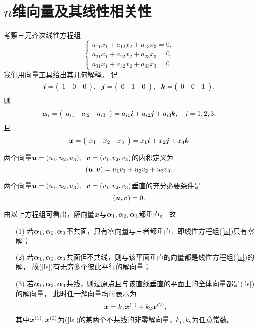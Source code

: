 \section{$n$维向量及其线性相关性}

考察三元齐次线性方程组
\begin{equation}\label{ls}
  \left\{
  \begin{array}{l}
    a_{11}x_1+a_{12}x_2+a_{13}x_3=0,\\[0.1in]
    a_{21}x_1+a_{22}x_2+a_{23}x_3=0,\\[0.1in]
    a_{31}x_1+a_{32}x_2+a_{33}x_3=0
  \end{array}
  \right.
\end{equation}
我们用向量工具给出其几何解释。
记
$$
{\boldsymbol{i}} = \left(
\begin{array}{ccc}
  1&
  0&
  0
\end{array}
\right), ~~
{\boldsymbol{j}} = \left(
\begin{array}{ccc}
  0&
  1&
  0
\end{array}
\right), ~~
{\boldsymbol{k}} = \left(
\begin{array}{ccc}
  0&
  0&
  1
\end{array}
\right),
$$
则
$$
\boldsymbol{\alpha}_i = \left(
\begin{array}{ccc}
  a_{i1}&
  a_{i2}&
  a_{i3}
\end{array}
\right) = a_{i1} {\boldsymbol{i}} + a_{i2} {\boldsymbol{j}} + a_{i3} {\boldsymbol{k}}, \quad i=1,2,3,
$$
且
$$
{\boldsymbol{x}} = \left(
\begin{array}{ccc}
  x_1&
  x_2&
  x_3
\end{array}
\right) = x_1{\boldsymbol{i}} + x_2{\boldsymbol{j}} + x_3{\boldsymbol{k}}
$$


\begin{dingyi}[向量的内积]
  两个向量${\boldsymbol{u}}=(u_1,u_2,u_3), ~~{\boldsymbol{v}}=(v_1,v_2,v_3)$的内积定义为
  $$
  ({\boldsymbol{u}},{\boldsymbol{v}})=u_1v_1+u_2v_2+u_3v_3.
  $$
\end{dingyi}

\begin{dingyi}[向量的垂直]
  两个向量${\boldsymbol{u}}=(u_1,u_2,u_3), ~~{\boldsymbol{v}}=(v_1,v_2,v_3)$垂直的充分必要条件是
  $$
  ({\boldsymbol{u}},{\boldsymbol{v}})=0.
  $$
\end{dingyi}


由以上方程组可看出，解向量${\boldsymbol{x}}$与$\boldsymbol{\alpha}_1,\boldsymbol{\alpha}_2,\boldsymbol{\alpha}_3$都垂直。 故
\begin{itemize}
\item[(1)] 若$\boldsymbol{\alpha}_1,\boldsymbol{\alpha}_2,\boldsymbol{\alpha}_3$不共面，只有零向量与三者都垂直，即线性方程组(\ref{ls})只有零解；
\item[(2)] 若$\boldsymbol{\alpha}_1,\boldsymbol{\alpha}_2,\boldsymbol{\alpha}_3$共面但不共线，则与该平面垂直的向量都是线性方程组(\ref{ls})的解，
  故(\ref{ls})有无穷多个彼此平行的解向量；
\item[(3)] 若$\boldsymbol{\alpha}_1,\boldsymbol{\alpha}_2,\boldsymbol{\alpha}_3$共线，则过原点且与该直线垂直的平面上的全体向量都是(\ref{ls})的解向量，
  此时任一解向量均可表示为
  $$
  {\boldsymbol{x}} = k_1 {\boldsymbol{x}}^{(1)} + k_2 {\boldsymbol{x}}^{(2)},
  $$
  其中${\boldsymbol{x}}^{(1)}, {\boldsymbol{x}}^{(2)}$为(\ref{ls})的某两个不共线的非零解向量，$k_1,k_2$为任意常数。
\end{itemize}


